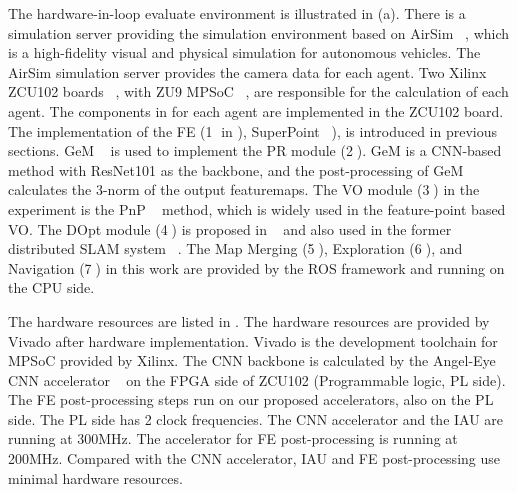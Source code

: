 The hardware-in-loop evaluate environment is illustrated in (a). There is a simulation server providing the simulation environment based on AirSim  ~\cite{shah2018airsim}, which is a high-fidelity visual and physical simulation for autonomous vehicles. The AirSim simulation server provides the camera data for each agent. Two Xilinx ZCU102 boards  ~\cite{zcu102}, with ZU9 MPSoC  ~\cite{MPSoC}, are responsible for the calculation of each agent. 
The components in  for each agent are implemented in the ZCU102 board. The implementation of the FE (\textcircled{1} in ), SuperPoint ~\cite{detone2018superpoint}), is introduced in previous sections. GeM  ~\cite{radenovic2018fine} is used to implement the PR module (\textcircled{2}). GeM is a CNN-based method with ResNet101 as the backbone, and the post-processing of GeM calculates the 3-norm of the output featuremaps.
The VO module (\textcircled{3}) in the experiment is the PnP  ~\cite{LepetitMoreno-Noguer-EPnP} method, which is widely used in the feature-point based VO. 
The DOpt module (\textcircled{4}) is proposed in  ~\cite{Choudhary:2017e66} and also used in the former distributed SLAM system ~\cite{cieslewski2018data}. 
The Map Merging  (\textcircled{5}), Exploration (\textcircled{6}), and Navigation (\textcircled{7}) in this work are provided by the ROS framework and running on the CPU side. 

The hardware resources are listed in . The hardware resources are provided by Vivado after hardware implementation. Vivado is the development toolchain for MPSoC provided by Xilinx. The CNN backbone is calculated by the Angel-Eye CNN accelerator ~\cite{guo2017angel} on the FPGA side of ZCU102 (Programmable logic, PL side). The FE post-processing steps run on our proposed accelerators, also on the PL side. The PL side has 2 clock frequencies. The CNN accelerator and the IAU are running at 300MHz. The accelerator for FE post-processing is running at 200MHz. Compared with the CNN accelerator, IAU and FE post-processing use minimal hardware resources.

